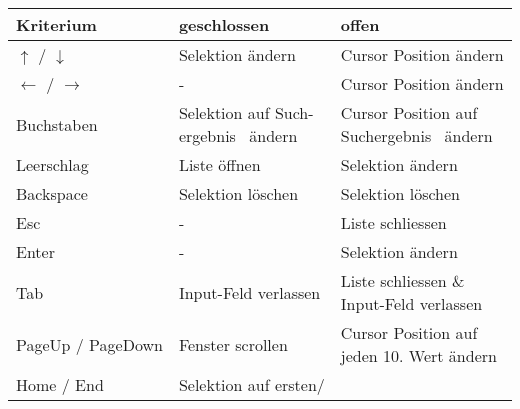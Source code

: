 \begin{table}[!htb] %
    \label{table:interactionNewComponent}
    \footnotesize
    \begin{adjustbox}{max width=\textwidth}
        \begin{threeparttable}
            \begin{tabular}{ l || l | l }
                \bf{Kriterium}    & \bf{geschlossen} & \bf{offen} \\
                \hline \hline
                $\uparrow$ / $\downarrow$    & Selektion ändern & Cursor Position ändern                 \\
                \hline
                $\leftarrow$ / $\rightarrow$ & -                & Cursor Position ändern                 \\
                \hline
                Buchstaben  & \tbbr{Selektion auf Such-\\ 
                                    ergebnis\tnote{1} \ ändern} & \tbbr{Cursor Position auf \\ 
                                                                        Suchergebnis\tnote{1} \ ändern}  \\
                \hline
                Leerschlag  & Liste öffnen                & Selektion ändern  \\
                \hline
                Backspace   & Selektion löschen           & Selektion löschen \\
                \hline
                Esc         & -                           & Liste schliessen  \\
                \hline \hline
                Enter       & -                           & Selektion ändern  \\
                \hline
                Tab         & Input-Feld verlassen        & \tbbr{Liste schliessen \& \\ 
                                                                  Input-Feld verlassen}                  \\
                \hline
                PageUp / PageDown & Fenster scrollen      & \tbbr{Cursor Position auf \\ 
                                                                  jeden 10. Wert ändern}                 \\
                \hline
                Home / End & \tbbr{Selektion auf ersten/ \\ 
}
\end{tabular}
\end{threeparttable}
\end{adjustbox}
\end{table}
